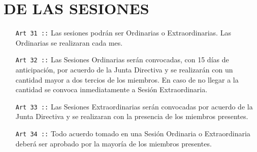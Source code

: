 \chapter{DE LAS SESIONES}
\begin{itemize}
  \item [\texttt{Art 31 ::}] Las sesiones podrán ser Ordinarias o Extraordinarias. Las Ordinarias se realizaran
  cada mes.
  \item [\texttt{Art 32 ::}] Las Sesiones Ordinarias serán convocadas, con 15 días de anticipación, por acuerdo
  de la Junta Directiva y se realizarán con un cantidad mayor a dos tercios de los
  miembros. En caso de no llegar a la cantidad se convoca inmediatamente a Sesión
  Extraordinaria.
  \item [\texttt{Art 33 ::}] Las Sesiones Extraordinarias serán convocadas por acuerdo de la Junta Directiva
  y se realizaran con la presencia de los miembros presentes.
  \item [\texttt{Art 34 ::}] Todo acuerdo tomado en una Sesión Ordinaria o Extraordinaria deberá ser aprobado por la mayoría de los miembros presentes.

\end{itemize}
